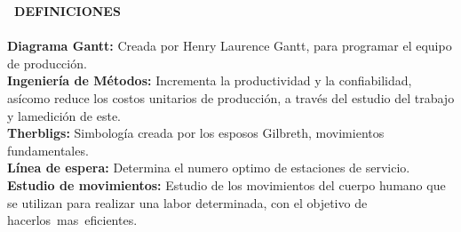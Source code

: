 \textbf{{\centering \         DEFINICIONES}}
\\
\\
\textbf{Diagrama Gantt:} Creada por Henry Laurence Gantt, para programar el equipo de producción.
\\
\textbf{Ingeniería de Métodos:} Incrementa la productividad y la confiabilidad, asícomo reduce los costos unitarios de producción, a través del estudio del trabajo y lamedición de este.
\\
\textbf{Therbligs:} Simbología creada por los esposos Gilbreth, movimientos fundamentales.
\\
\textbf{Línea de espera:} Determina el numero optimo de estaciones de servicio.
\\
\textbf{Estudio de movimientos:} Estudio de los movimientos del cuerpo humano que se utilizan para realizar una labor determinada, con el objetivo de hacerlos mas eficientes.